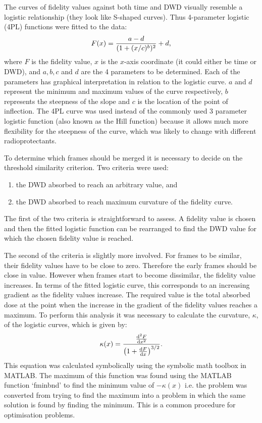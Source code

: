 The curves of fidelity values against both time and DWD visually resemble a logistic relationship (they look like S-shaped curves).
Thus 4-parameter logistic (4PL) functions were fitted to the data:
\begin{equation}
    F(x) = \frac{a - d}{(1 + (x/c)^b)^2} + d,
    \label{eq:4PL}
\end{equation}
where $F$ is the fidelity value, $x$ is the $x$-axis coordinate (it could either be time or DWD), and $a, b, c$ and $d$ are the 4 parameters to be determined.
Each of the parameters has graphical interpretation in relation to the logistic curve.
$a$ and $d$ represent the minimum and maximum values of the curve respectively, $b$ represents the steepness of the slope and $c$ is the location of the point of inflection.
The 4PL curve was used instead of the commonly used 3 parameter logistic function (also known as the Hill function) because it allows much more flexibility for the steepness of the curve, which was likely to change with different radioprotectants.

To determine which frames should be merged it is necessary to decide on the threshold similarity criterion.
Two criteria were used:
\begin{enumerate}
    \item the DWD absorbed to reach an arbitrary value, and
    \item the DWD absorbed to reach maximum curvature of the fidelity curve.
\end{enumerate}
The first of the two criteria is straightforward to assess.
A fidelity value is chosen and then the fitted logistic function can be rearranged to find the DWD value for which the chosen fidelity value is reached.

The second of the criteria is slightly more involved. For frames to be similar, their fidelity values have to be close to zero.
Therefore the early frames should be close in value.
However when frames start to become dissimilar, the fidelity value increases.
In terms of the fitted logistic curve, this corresponds to an increasing gradient as the fidelity values increase.
The required value is the total absorbed dose at the point when the increase in the gradient of the fidelity values reaches a maximum.
To perform this analysis it was necessary to calculate the curvature, $\kappa$, of the logistic curves, which is  given by:
\begin{equation}
    \kappa(x) = \frac{\frac{\mathrm{d}^2F}{\mathrm{d}x^2}}{\left( 1 + \frac{\mathrm{d}F}{\mathrm{d}x}\right)^{3/2}}.
    \label{eq:Curvature}
\end{equation}
This equation was calculated symbolically using the symbolic math toolbox in MATLAB. The maximum of this function was found using the MATLAB function `fminbnd' to find the minimum value of $-\kappa(x)$ i.e. the problem was converted from trying to find the maximum into a problem in which the same solution is found by finding the minimum. This is a common procedure for optimisation problems.

